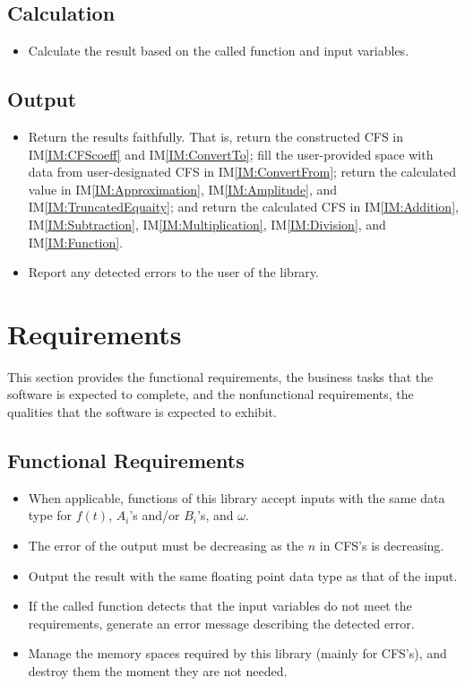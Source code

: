 \documentclass[12pt]{article}
\newcounter{calnum} %
\newcounter{outputnum} %
\newcommand{\iref}[1]{IM\ref{#1}}
\newcounter{reqnum} %
\begin{document}
\subsection{Calculation} \label{sec_Calculation}
\begin{itemize}
\item[C\refstepcounter{calnum}\thecalnum \label{Cal:Normal}:] 
Calculate the result based on the called function and input variables.

\end{itemize}
\subsection{Output} \label{sec_Output}    
\begin{itemize}
\item[O\refstepcounter{outputnum}\theoutputnum \label{Output:Faithful}:] 
Return the results faithfully. That is, return the constructed CFS in \iref{IM:CFScoeff} and \iref{IM:ConvertTo}; fill the user-provided space with data from user-designated CFS in \iref{IM:ConvertFrom}; return the calculated value in \iref{IM:Approximation}, \iref{IM:Amplitude}, and \iref{IM:TruncatedEquaity}; and return the calculated CFS in \iref{IM:Addition}, \iref{IM:Subtraction}, \iref{IM:Multiplication}, \iref{IM:Division}, and \iref{IM:Function}. 
\item[O\refstepcounter{outputnum}\theoutputnum \label{Output:Error}:] 
Report any detected errors to the user of the library.
\end{itemize}
\section{Requirements}\label{Sc:Req}

This section provides the functional requirements, the business tasks that the
software is expected to complete, and the nonfunctional requirements, the
qualities that the software is expected to exhibit.

\subsection{Functional Requirements}

\noindent \begin{itemize}
\newcommand{\ritem}[1]{\item[R\refstepcounter{reqnum}\thereqnum \label{R:#1}:]}
\ritem{InputDataType} 
When applicable, functions of this library accept inputs with the same 
data type for $f(t)$, $A_i$'s and/or $B_i$'s, and $\omega$. 
\ritem{OutputError} 
The error of the output must be decreasing as the $n$ in CFS's is decreasing.
\ritem{OutputDataType} 
Output the result with the same floating point data type as that of the input.
\ritem{ErrorMessage}
If the called function detects that the input variables do not 
meet the requirements, generate an error message describing 
the detected error.
\ritem{Memory} 
Manage the memory spaces required by this library 
(mainly for CFS's), and destroy them the moment they are not needed.

\end{itemize}
\end{document}
